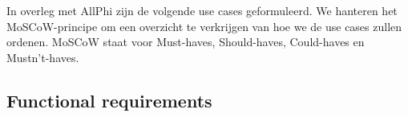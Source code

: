 
\chapter{}%
\label{ch:requirements-analyse}


In overleg met AllPhi zijn de volgende use cases geformuleerd. We hanteren het MoSCoW-principe om een overzicht te verkrijgen van hoe we de use cases zullen ordenen. MoSCoW staat voor Must-haves, Should-haves, Could-haves en Mustn't-haves.

\section{Functional requirements}
